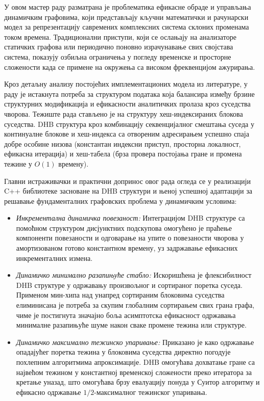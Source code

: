 
У овом мастер раду разматрана је проблематика ефикасне обраде и управљања динамичким графовима, који представљају кључни математички и рачунарски модел за репрезентацију савремених комплексних система склоних променама током времена. Традиционални приступи, који се ослањају на анализаторе статичких графова или периодично поновно израчунавање свих својстава система, показују озбиљна ограничења у погледу временске и просторне сложености када се примене на окружења са високом фреквенцијом ажурирања.

Кроз детаљну анализу постојећих имплементационих модела из литературе, у раду је истакнута потреба за структуром података која балансира између брзине структурних модификација и ефикасности аналитичких пролаза кроз суседства чворова. Тежиште рада стављено је на структуру хеш-индексираних блокова суседства. DHB структура кроз комбинацију секвенцијалног смештања суседа у континуалне блокове и хеш-индекса са отвореним адресирањем успешно спаја добре особине низова (константан индексни приступ, просторна локалност, ефикасна итерација) и хеш-табела (брза провера постојања гране и промена тежине у $O(1)$ времену).

Главни истраживачки и практични допринос овог рада огледа се у реализацији C++ библиотеке засноване на DHB структури и њеној успешној адаптацији за решавање фундаменталних графовских проблема у динамичким условима:
\begin{itemize}
    \item \textit{Инкрементална динамичка повезаност:} Интеграцијом DHB структуре са помоћном структуром дисјунктних подскупова омогућено је праћење компоненти повезаности и одговарање на упите о повезаности чворова у амортизованом готово константном времену, уз задржавање ефикасних инкременталних измена.
    \item \textit{Динамичко минимално разапињуће стабло:} Искоришћена је флексибилност DHB структуре у одржавању произвољног и сортираног поретка суседа. Применом мин-хипа над унапред сортираним блоковима суседства елиминисана је потреба за скупим глобалним сортирањем свих грана графа, чиме је постигнута значајно боља асимптотска ефикасност одржавања минималне разапињуће шуме након сваке промене тежина или структуре.
    \item \textit{Динамичко максимално тежинско упаривање:} Приказано је како одржавање опадајућег поретка тежина у блоковима суседства директно погодује похлепним алгоритмима апроксимације. DHB омогућава дохватање гране са највећом тежином у константној временској сложености преко итератора за кретање уназад, што омогућава брзу евалуацију понуда у Суитор алгоритму и ефикасно одржавање $1/2$-максималног тежинског упаривања.
\end{itemize}

